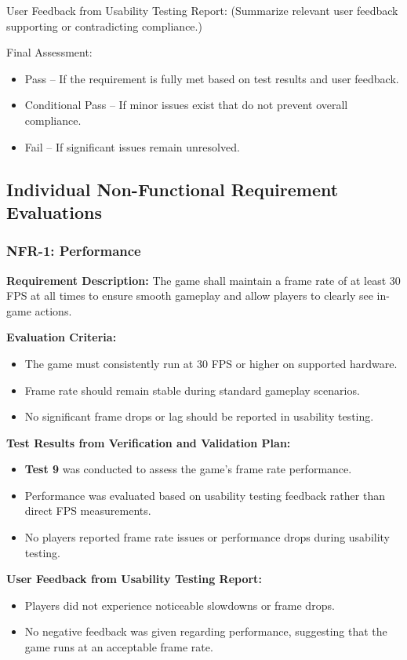 \documentclass[12pt, titlepage]{article}
\begin{document}
User Feedback from Usability Testing Report:
(Summarize relevant user feedback supporting or contradicting compliance.)

Final Assessment:
\begin{itemize}
    \item Pass – If the requirement is fully met based on test results and user feedback.
    \item Conditional Pass – If minor issues exist that do not prevent overall compliance.
    \item Fail – If significant issues remain unresolved.
\end{itemize}

\subsection{Individual Non-Functional Requirement Evaluations}


\subsubsection{NFR-1: Performance}
\label{NFR1} 

\textbf{Requirement Description:}  
The game shall maintain a frame rate of at least 30 FPS at all times to ensure smooth gameplay and allow players to clearly see in-game actions.

\textbf{Evaluation Criteria:}  
\begin{itemize}
    \item The game must consistently run at 30 FPS or higher on supported hardware.
    \item Frame rate should remain stable during standard gameplay scenarios.
    \item No significant frame drops or lag should be reported in usability testing.
\end{itemize}

\textbf{Test Results from Verification and Validation Plan:}  
\begin{itemize}
    \item \textbf{Test 9} was conducted to assess the game's frame rate performance.
    \item Performance was evaluated based on usability testing feedback rather than direct FPS measurements.
    \item No players reported frame rate issues or performance drops during usability testing.
\end{itemize}

\textbf{User Feedback from Usability Testing Report:}  
\begin{itemize}
    \item Players did not experience noticeable slowdowns or frame drops.
    \item No negative feedback was given regarding performance, suggesting that the game runs at an acceptable frame rate.
\end{itemize}
\end{document}
